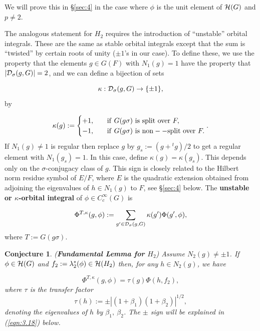 \documentclass[12pt,letterpaper]{article}
\newtheorem{conjecture}[theorem]{Conjecture}
\def\hhh{{\cal H}}
\def\ddd{{\cal D}}
\begin{document}
We will prove this in \S \ref{sec:4} 
in the case where $\phi$ is the unit element
of $\hhh (G)$ and $p\not= 2$.
 
The analogous statement for $H_2$ requires the introduction
of ``unstable'' orbital integrals. These are the same as stable orbital
integrals except that the sum is ``twisted'' by certain roots of unity
($\pm 1$'s in our case). To define these, we use the property that
the elements $g \in G(F)$ with $N_1(g) = 1$ have the property
that $|\ddd_{\sigma}(g,G)|=2$, and we can define a bijection of sets

\begin{equation}
\label{eqn:1.25}
\kappa : \ddd_{\sigma}(g,G) \rightarrow \{\pm 1\},
\end{equation}
by

\[
\kappa (g) := 
\begin{cases} 
+1,&\ \ \ {\rm if}\ G(g\sigma)\ {\rm is\ split\ over}\ F,\\
-1,&\ \ \ {\rm if}\ G(g\sigma)\ {\rm is\ non--split\ over}\ F .
\end{cases}.
\]
If $N_1(g) \not= 1$ is regular then replace $g$ by $g_{s} :=
(g+{^{t}g})/2$ to get a regular element with $N_1(g_{s})=1$. In this
case, define $\kappa (g) = \kappa (g_{s})$. This depends only
on the $\sigma$-conjugacy class of $g$. This sign is closely related
to the Hilbert norm residue symbol of $E/F$, where $E$ is the quadratic
extension obtained from adjoining the eigenvalues of $h \in N_1(g)$ to
$F$, see \S \ref{sec:4} below. 
The {\bf unstable or $\kappa$-orbital integral}
of $\phi \in C^\infty_c(G)$ is

\begin{equation}
\label{eqn:1.26}
\Phi^{T,\kappa}(g,\phi ):= \sum_{g' \in \ddd_{\sigma}(g,G)} 
\kappa (g')\Phi (g',\phi ),
\end{equation}
where $T:=G(g\sigma )$.

\begin{conjecture}
({\bf Fundamental Lemma for $H_2$})
Assume $N_2(g) \not= 
\pm 1$. If $\phi \in \hhh (G)$ and $f_2:=\lambda_2^*(\phi ) \in
\hhh (H_2)$ then, for any $h \in N_2(g)$, we have

\begin{equation}
\label{eqn:1.27}
\Phi^{T,\kappa}(g,\phi ) = \tau (g)\Phi(h,f_2),
\end{equation}
where $\tau$ is the transfer factor
\[
\tau (h) := \pm |(1+\beta_{1})(1+\beta_{2})|^{1/2},
\]
denoting the eigenvalues of $h$ by $\beta_{1},\ \beta_{2}$. The $\pm$ sign
will be explained in (\ref{eqn:3.18}) below.
\end{conjecture}
 
\end{document}

